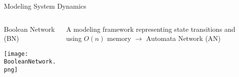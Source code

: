 \documentclass[8pt]{beamer}
\begin{document}
\begin{frame}{Modeling System Dynamics}
    \begin{columns}
    \begin{column}{0.45\textwidth}
    Boolean Network (BN)
    
    \vspace{0.5cm}
    \texttt{[image: BooleanNetwork.png]}
    \end{column}
    \pause
    \begin{column}{0.45\textwidth}
    A modeling framework representing state transitions and using $O(n)$ memory $\to$ Automata Network (AN)
    
    \pause
    \vspace{0.5cm}
    
    
    
    
    \end{column}
    \end{columns}
\end{frame}
\end{document}
